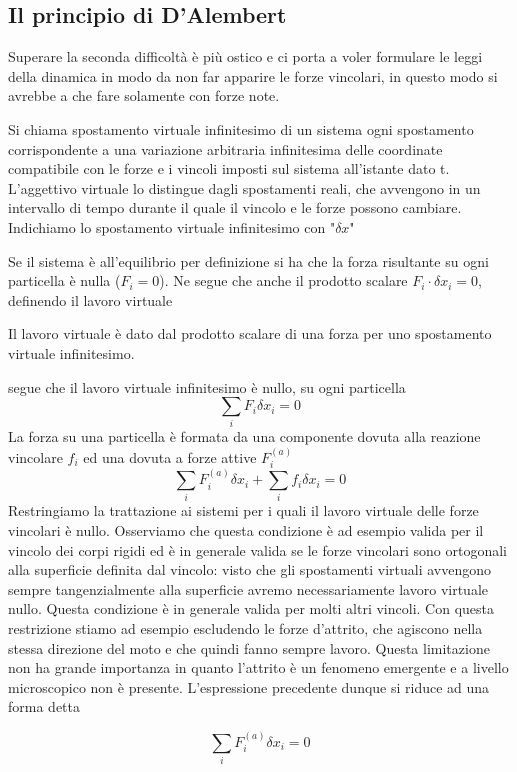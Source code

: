 \documentclass[
10pt, %
a4paper, %
oneside, %
headinclude,footinclude, %
BCOR5mm, %
]{scrartcl}
\begin{document}
\subsection{Il principio di D'Alembert}
Superare la seconda difficoltà è più ostico e ci porta a voler formulare le leggi della dinamica in modo da non far apparire le forze vincolari, in questo modo si avrebbe a che fare solamente con forze note. 
\begin{definizione}
	Si chiama spostamento virtuale infinitesimo di un sistema ogni spostamento corrispondente a una variazione arbitraria infinitesima delle coordinate compatibile con le forze e i vincoli imposti sul sistema all'istante dato t. L'aggettivo virtuale lo distingue dagli spostamenti reali, che avvengono in un intervallo di tempo durante il quale il vincolo e le forze possono cambiare. Indichiamo lo spostamento virtuale infinitesimo con "$\delta x$"
\end{definizione}
Se il sistema è all'equilibrio per definizione si ha che la forza risultante su ogni particella è nulla (\(F_i = 0\)). Ne segue che anche il prodotto scalare \(F_i\cdot \delta x_i = 0\), definendo il lavoro virtuale
\begin{definizione}
	Il lavoro virtuale è dato dal prodotto scalare di una forza per uno spostamento virtuale infinitesimo.
\end{definizione}
segue che il lavoro virtuale infinitesimo è nullo, su ogni particella
\[\sum_i F_i\delta x_i = 0\]
La forza su una particella è formata da una componente dovuta alla reazione vincolare \(f_i\) ed una dovuta a forze attive \(F_i^{(a)}\)
\[\sum_i F_i^{(a)}\delta x_i + \sum_i  f_i\delta x_i = 0\]
Restringiamo la trattazione ai sistemi per i quali il lavoro virtuale delle forze vincolari è nullo. Osserviamo che questa condizione è ad esempio valida per il vincolo dei corpi rigidi ed è in generale valida se le forze vincolari sono ortogonali alla superficie definita dal vincolo: visto che gli spostamenti virtuali avvengono sempre tangenzialmente alla superficie avremo necessariamente lavoro virtuale nullo. Questa condizione è in generale valida per molti altri vincoli. Con questa restrizione stiamo ad esempio escludendo le forze d'attrito, che agiscono  nella stessa direzione del moto e che quindi fanno sempre lavoro. Questa limitazione non ha grande importanza in quanto l'attrito è un fenomeno emergente e a livello microscopico non è presente.	
L'espressione precedente dunque si riduce ad una forma detta
\begin{definizione}
	\[\sum_i F_i^{(a)}\delta x_i = 0\]
\end{definizione}
\end{document}
